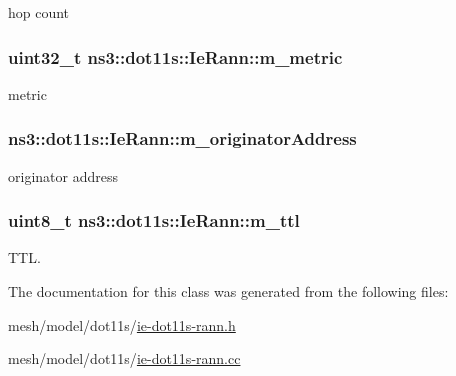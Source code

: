 hop count 

\subsubsection[{\texorpdfstring{m\+\_\+metric}{m_metric}}]{\setlength{\rightskip}{0pt plus 5cm}uint32\+\_\+t ns3\+::dot11s\+::\+Ie\+Rann\+::m\+\_\+metric\hspace{0.3cm}{\ttfamily [private]}}\hypertarget{classns3_1_1dot11s_1_1IeRann_af20a95cd95a0eea317e0ec7947691d16}{}\label{classns3_1_1dot11s_1_1IeRann_af20a95cd95a0eea317e0ec7947691d16}


metric 

\subsubsection[{\texorpdfstring{m\+\_\+originator\+Address}{m_originatorAddress}}]{ ns3\+::dot11s\+::\+Ie\+Rann\+::m\+\_\+originator\+Address\hspace{0.3cm}{\ttfamily [private]}}\hypertarget{classns3_1_1dot11s_1_1IeRann_a26139f787881cbf20a6c61e1da931df9}{}\label{classns3_1_1dot11s_1_1IeRann_a26139f787881cbf20a6c61e1da931df9}


originator address 

\subsubsection[{\texorpdfstring{m\+\_\+ttl}{m_ttl}}]{\setlength{\rightskip}{0pt plus 5cm}uint8\+\_\+t ns3\+::dot11s\+::\+Ie\+Rann\+::m\+\_\+ttl\hspace{0.3cm}{\ttfamily [private]}}\hypertarget{classns3_1_1dot11s_1_1IeRann_a5797397e4b461481c9e00581e0923b7d}{}\label{classns3_1_1dot11s_1_1IeRann_a5797397e4b461481c9e00581e0923b7d}


T\+TL. 



The documentation for this class was generated from the following files\+:\begin{DoxyCompactItemize}
\item 
mesh/model/dot11s/\hyperlink{ie-dot11s-rann_8h}{ie-\/dot11s-\/rann.\+h}\item 
mesh/model/dot11s/\hyperlink{ie-dot11s-rann_8cc}{ie-\/dot11s-\/rann.\+cc}\end{DoxyCompactItemize}

